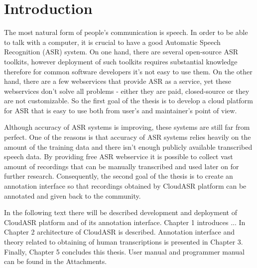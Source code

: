 \chapter*{Introduction}

The most natural form of people's communication is speech.
In order to be able to talk with a computer,
  it is crucial to have a good Automatic Speech Recognition (ASR) system.
On one hand, there are several open-source ASR toolkits,
  however deployment of such toolkits requires substantial knowledge therefore
  for common software developers it's not easy to use them.
On the other hand, there are a few webservices that provide ASR as a service,
  yet these webservices don't solve all problems -
  either they are paid, closed-source or they are not customizable.
So the first goal of the thesis is to develop a cloud platform for ASR
  that is easy to use both from user's and maintainer's point of view.

Although accuracy of ASR systems is improving,
  these systems are still far from perfect.
One of the reasons is that accuracy of ASR systems relies heavily on the amount of the training data
  and there isn't enough publicly available transcribed speech data.
By providing free ASR webservice it is possible to collect vast amount of recordings
  that can be manually transcribed and used later on for further research.
Consequently, the second goal of the thesis is to create an annotation interface
  so that recordings obtained by CloudASR platform can be annotated and given back to the community.

In the following text there will be described development and deployment of CloudASR platform and of its annotation interface.
Chapter 1 introduces ...
In Chapter 2 architecture of CloudASR is described.
Annotation interface and theory related to obtaining of human transcriptions is presented in Chapter 3.
Finally, Chapter 5 concludes this thesis.
User manual and programmer manual can be found in the Attachments.
